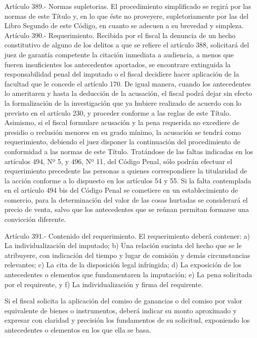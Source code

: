     Artículo 389.- Normas supletorias. El procedimiento simplificado se regirá por las normas de este Título y, en lo que éste no proveyere, supletoriamente por las del Libro Segundo de este Código, en cuanto se adecuen a su brevedad y simpleza.
    Artículo 390.- Requerimiento. Recibida por el fiscal la denuncia de un hecho constitutivo de alguno de los delitos a que se refiere el artículo 388, solicitará del juez de garantía competente la citación inmediata a audiencia, a menos que fueren insuficientes los antecedentes aportados, se encontrare extinguida la responsabilidad penal del imputado o el fiscal decidiere hacer aplicación de la facultad que le concede el artículo 170. De igual manera, cuando los antecedentes lo ameritaren y hasta la deducción de la acusación, el fiscal podrá dejar sin efecto la formalización de la investigación que ya hubiere realizado de acuerdo con lo previsto en el artículo 230, y proceder conforme a las reglas de este Título.
    Asimismo, si el fiscal formulare acusación y la pena requerida no excediere de presidio o reclusión menores en su grado mínimo, la acusación se tendrá como requerimiento, debiendo el juez disponer la continuación del procedimiento de conformidad a las normas de este Título.
    Tratándose de las faltas indicadas en los artículos 494, Nº 5, y 496, Nº 11, del Código Penal, sólo podrán efectuar el requerimiento precedente las personas a quienes correspondiere la titularidad de la acción conforme a lo dispuesto en los artículos 54 y 55.
    Si la falta contemplada en el artículo 494 bis del Código Penal se cometiere en un establecimiento de comercio, para la determinación del valor de las cosas hurtadas se considerará el precio de venta, salvo que los antecedentes que se reúnan permitan formarse una convicción diferente.

    Artículo 391.- Contenido del requerimiento. El requerimiento deberá contener:
    a) La individualización del imputado;
    b) Una relación sucinta del hecho que se le atribuyere, con indicación del tiempo y lugar de
comisión y demás circunstancias relevantes;
    c) La cita de la disposición legal infringida;
    d) La exposición de los antecedentes o elementos que fundamentaren la imputación;
    e) La pena solicitada por el requirente, y
    f) La individualización y firma del requirente.

    Si el fiscal solicita la aplicación del comiso de ganancias o del comiso por valor equivalente de bienes o instrumentos, deberá indicar su monto aproximado y expresar con claridad y precisión los fundamentos de su solicitud, exponiendo los antecedentes o elementos en los que ella se basa.


